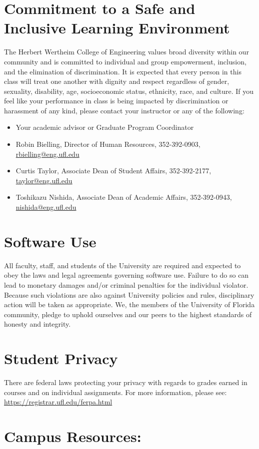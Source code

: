 \documentclass[11pt, article, oneside]{memoir}
\begin{document}
\section{Commitment to a Safe and Inclusive Learning Environment}
The Herbert Wertheim College of Engineering values broad diversity within our community and is committed to individual and group empowerment, inclusion, and the elimination of discrimination. It is expected that every person in this class will treat one another with dignity and respect regardless of gender, sexuality, disability, age, socioeconomic status, ethnicity, race, and culture.
If you feel like your performance in class is being impacted by discrimination or harassment of any kind, please contact your instructor or any of the following:
\begin{itemize}
\item  Your academic advisor or Graduate Program Coordinator
\item Robin Bielling, Director of Human Resources, 352-392-0903, \url{rbielling@eng.ufl.edu}
\item Curtis Taylor, Associate Dean of Student Affairs, 352-392-2177, \url{taylor@eng.ufl.edu}
\item Toshikazu Nishida, Associate Dean of Academic Affairs, 352-392-0943, \url{nishida@eng.ufl.edu}
\end{itemize}

\section{Software Use}
All faculty, staff, and students of the University are required and expected to obey the laws and legal agreements governing software use. Failure to do so can lead to monetary damages and/or criminal penalties for the individual violator. Because such violations are also against University policies and rules, disciplinary action will be taken as appropriate. We, the members of the University of Florida community, pledge to uphold ourselves and our peers to the highest standards of honesty and integrity.

\section{Student Privacy}
There are federal laws protecting your privacy with regards to grades earned in courses and on individual assignments. For more information, please see: \url{https://registrar.ufl.edu/ferpa.html}

\section{Campus Resources:}
\end{document}
